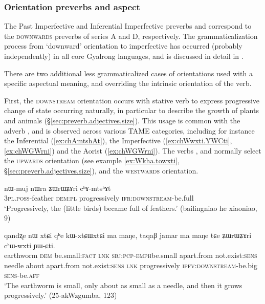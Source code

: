 \subsubsection{Orientation preverbs and aspect} \label{sec:orientation.preverb.aspect}
The Past Imperfective and Inferential Imperfective preverbs  and  correspond to the \textsc{downwards} preverbs of series A and D, respectively. The grammaticalization process from `downward' orientation to imperfective has occurred (probably independently) in all core Gyalrong languages, and is discussed in detail in \citet{lin11direction}.

There are two additional less grammaticalized cases of orientations used with a specific aspectual meaning, and overriding the intrinsic orientation of the verb.

First, the \textsc{downstream} orientation occurs with stative verb to express progressive change of state occurring naturally, in particular to describe the growth of plants and animals (§\ref{sec:preverb.adjectives.size}). This usage is common with the adverb , and is observed across various TAME categories, including for instance the Inferential (\ref{ex:chAmtshAt}), the Imperfective (\ref{ex:chWwxti.YWCti}, \ref{ex:chWGWrni}) and the Aorist (\ref{ex:chWGWrni}). The verbs , and  normally select the \textsc{upwards} orientation (see example \ref{ex:Wkha.towxti}, §\ref{sec:preverb.adjectives.size}), and  the \textsc{westwards} orientation.

\begin{exe}
\ex \label{ex:chAmtshAt}
\gll nɯ-muj nɯra ʑɯrɯʑɤri cʰɤ-mtsʰɤt   \\
 \textsc{3pl}.\textsc{poss}-feather \textsc{dem}:\textsc{pl} progressively \textsc{ifr}:\textsc{downstream}-be.full \\
\glt `Progressively, the (little birds) became full of feathers.' (bailingniao he xiaoniao, 9)
\end{exe}

\begin{exe}
\ex \label{ex:chWwxti.YWCti}
\gll qandʐe nɯ xtɕi qʰe kɯ-xtɕɯ\redp{}xtɕi ma maŋe, taqaβ jamar ma maŋe tɕe ʑɯrɯʑɤri cʰɯ-wxti ɲɯ-ɕti. \\
earthworm \textsc{dem} be.small:\textsc{fact} \textsc{lnk} \textsc{sbj}:\textsc{pcp}-\textsc{emph}\redp{}be.small apart.from not.exist:\textsc{sens} needle about apart.from not.exist:\textsc{sens} \textsc{lnk} progressively \textsc{ipfv}:\textsc{downstream}-be.big \textsc{sens}-be.\textsc{aff} \\
\glt `The earthworm is small, only about as small as a needle, and then it grows progressively.' (25-akWzgumba, 123)
\end{exe}

